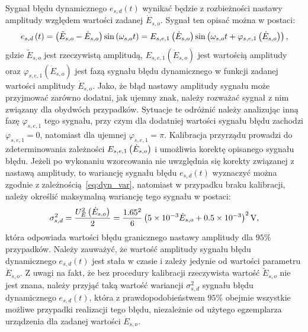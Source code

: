 Sygnał błędu dynamicznego $e_{s,d}(t)$ wynikać będzie z rozbieżności nastawy amplitudy względem wartości zadanej $\dot{E}_{s,o}$. Sygnał ten opisać można w postaci:
\begin{equation}
e_{s,d} \left(t\right) = \left(\tilde{E}_{s,o} - \dot{E}_{s,o}\right) \sin \left(\omega_{s,o} t\right) = E_{s,e,1} \left(\dot{E}_{s,o}\right) \sin \left(\omega_{s,o} t + \varphi_{s,e,1} \left(\dot{E}_{s,o}\right)\right) \label{eq:pom_gen_err_dyn_mono},
\end{equation}
gdzie $\tilde{E}_{s,o}$ jest rzeczywistą amplitudą, $E_{s,e,1}(\dot{E}_{s,o})$ jest wartością amplitudy oraz $\varphi_{s,e,1}(\dot{E}_{s,o})$ jest fazą sygnału błędu dynamicznego w funkcji zadanej wartości amplitudy $\dot{E}_{s,o}$. Jako, że błąd nastawy amplitudy sygnału może przyjmować zarówno dodatni, jak ujemny znak, należy rozważać sygnał z nim związany dla obydwóch przypadków. Sytuacje te odróżnić należy analizując inną fazę $\varphi_{s,e,1}$ tego sygnału, przy czym dla dodatniej wartości sygnału błędu zachodzi $\varphi_{s,e,1} = 0$, natomiast dla ujemnej $\varphi_{s,e,1} = \pi$. Kalibracja przyrządu prowadzi do zdeterminowania zależności $E_{s,e,1} \left(\dot{E}_{s,o}\right)$ i umożliwia korektę opisanego sygnału błędu. Jeżeli po wykonaniu wzorcowania nie uwzględnia się korekty związanej z nastawą amplitudy, to wariancję sygnału błędu $e_{s,d}(t)$ wyznaczyć można zgodnie z zależnością~\eqref{eq:dyn_var}, natomiast w przypadku braku kalibracji, należy określić maksymalną wariancję tego sygnału w postaci:
\begin{equation}
\sigma_{s,d}^{2} = \frac{U_{E}^{2} \emb{\dot{E}_{s,o}}}{2} = \frac{1.65^{2}}{6} \emb{\num{5e-3} \dot{E}_{s,o} + \num{0.5e-3}}^{2} \unit{V} \label{eq:pom_gen_var_dyn},
\end{equation}
która odpowiada wartości błędu granicznego nastawy amplitudy dla $95\%$ przypadków. Należy zauważyć, że wartość amplitudy sygnału błędu dynamicznego $e_{s,d}(t)$ jest stała w czasie i zależy jedynie od wartości parametru $\dot{E}_{s,o}$. Z uwagi na fakt, że bez procedury kalibracji rzeczywista wartość $\tilde{E}_{s,o}$ nie jest znana, należy przyjąć taką wartość wariancji $\sigma_{s,d}^{2}$ sygnału błędu dynamicznego $e_{s,d}(t)$, która z prawdopodobieństwem $95\%$ obejmie wszystkie możliwe przypadki realizacji tego błędu, niezależnie od użytego egzemplarza urządzenia dla zadanej wartości $\dot{E}_{s,o}$.

